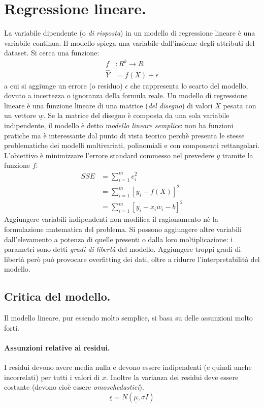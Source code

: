 \documentclass[11pt, a4page, twocolumn]{article}
\begin{document}
\section{Regressione lineare.}
La variabile dipendente (o \textit{di risposta}) in un modello di regressione lineare è una variabile continua.
Il modello spiega una variabile dall'insieme degli attributi del dataset.
Si cerca una funzione: 
\begin{align*}
  f &: R^k \rightarrow R \\
  \widehat{Y} &= f(X) + \epsilon
\end{align*}
a cui si aggiunge un errore (o residuo) $\epsilon$ che rappresenta lo scarto del modello, dovuto a incertezza o ignoranza della formula reale. \newline
Un modello di regressione lineare è una funzione lineare di una matrice (\textit{del disegno}) di valori $X$ pesata con un vettore $\underline{w}$.
Se la matrice del disegno è composta da una sola variabile indipendente, il modello è detto \textit{modello lineare semplice}: non ha funzioni pratiche ma è interessante dal punto di vista teorico perchè presenta le stesse problematiche dei modelli multivariati, polinomiali e con componenti rettangolari. \newline
L'obiettivo è minimizzare l'errore standard commesso nel prevedere $y$ tramite la funzione $f$:
\begin{align*}
  SSE &= \sum^m_{i=1}{e^2_i} \\
      &= \sum^m_{i=1}{[y_i - f(X)]^2} \\
      &= \sum^m_{i=1}{[y_i - x_i w_i - b]^2}
\end{align*}
Aggiungere variabili indipendenti non modifica il ragionamento nè la formulazione matematica del problema.
Si possono aggiungere altre variabili dall'elevamento a potenza di quelle presenti o dalla loro moltiplicazione: i parametri sono detti \textit{gradi di libertà} del modello.
Aggiungere troppi gradi di libertà però può provocare overfitting dei dati, oltre a ridurre l'interpretabilità del modello.

\subsection{Critica del modello.}
Il modello lineare, pur essendo molto semplice, si basa su delle assunzioni molto forti.

\paragraph{Assunzioni relative ai residui.}
I residui devono avere media nulla e devono essere indipendenti (e quindi anche incorrelati) per tutti i valori di $x$.
Inoltre la varianza dei residui deve essere costante (devono cioè essere \textit{omoschedastici}).
\begin{equation*}
  \underline{\epsilon} = N(\underline{\mu}, \sigma{}I)
\end{equation*}
\end{document}
